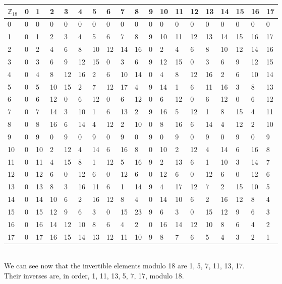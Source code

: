 \documentclass[paper=letter, fontsize=11pt]{scrartcl} %
\begin{document}
\begin{tabular}{|l|l|l|l|l|l|l|l|l|l|l|l|l|l|l|l|l|l|l|}
\hline
$\mathbb{Z}_{18}$ & 0 & 1  & 2  & 3  & 4  & 5  & 6  & 7  & 8  & 9 & 10 & 11 & 12 & 13 & 14 & 15 & 16 & 17 \\ \hline
0                 & 0 & 0  & 0  & 0  & 0  & 0  & 0  & 0  & 0  & 0 & 0  & 0  & 0  & 0  & 0  & 0  & 0  & 0  \\ \hline
1                 & 0 & 1  & 2  & 3  & 4  & 5  & 6  & 7  & 8  & 9 & 10 & 11 & 12 & 13 & 14 & 15 & 16 & 17 \\ \hline
2                 & 0 & 2  & 4  & 6  & 8  & 10 & 12 & 14 & 16 & 0 & 2  & 4  & 6  & 8  & 10 & 12 & 14 & 16 \\ \hline
3                 & 0 & 3  & 6  & 9  & 12 & 15 & 0  & 3  & 6  & 9 & 12 & 15 & 0  & 3  & 6  & 9  & 12 & 15 \\ \hline
4                 & 0 & 4  & 8  & 12 & 16 & 2  & 6  & 10 & 14 & 0 & 4  & 8  & 12 & 16 & 2  & 6  & 10 & 14 \\ \hline
5                 & 0 & 5  & 10 & 15 & 2  & 7  & 12 & 17 & 4  & 9 & 14 & 1  & 6  & 11 & 16 & 3  & 8  & 13 \\ \hline
6                 & 0 & 6  & 12 & 0  & 6  & 12 & 0  & 6  & 12 & 0 & 6  & 12 & 0  & 6  & 12 & 0  & 6  & 12 \\ \hline
7                 & 0 & 7  & 14 & 3  & 10 & 1  & 6  & 13 & 2  & 9 & 16 & 5  & 12 & 1  & 8  & 15 & 4  & 11 \\ \hline
8                 & 0 & 8  & 16 & 6  & 14 & 4  & 12 & 2  & 10 & 0 & 8  & 16 & 6  & 14 & 4  & 12 & 2  & 10 \\ \hline
9                 & 0 & 9  & 0  & 9  & 0  & 9  & 0  & 9  & 0  & 9 & 0  & 9  & 0  & 9  & 0  & 9  & 0  & 9  \\ \hline
10                & 0 & 10 & 2  & 12 & 4  & 14 & 6  & 16 & 8  & 0 & 10 & 2  & 12 & 4  & 14 & 6  & 16 & 8  \\ \hline
11                & 0 & 11 & 4  & 15 & 8  & 1  & 12 & 5  & 16 & 9 & 2  & 13 & 6  & 1  & 10 & 3  & 14 & 7  \\ \hline
12                & 0 & 12 & 6  & 0  & 12 & 6  & 0  & 12 & 6  & 0 & 12 & 6  & 0  & 12 & 6  & 0  & 12 & 6  \\ \hline
13                & 0 & 13 & 8  & 3  & 16 & 11 & 6  & 1  & 14 & 9 & 4  & 17 & 12 & 7  & 2  & 15 & 10 & 5  \\ \hline
14                & 0 & 14 & 10 & 6  & 2  & 16 & 12 & 8  & 4  & 0 & 14 & 10 & 6  & 2  & 16 & 12 & 8  & 4  \\ \hline
15                & 0 & 15 & 12 & 9  & 6  & 3  & 0  & 15 & 23 & 9 & 6  & 3  & 0  & 15 & 12 & 9  & 6  & 3  \\ \hline
16                & 0 & 16 & 14 & 12 & 10 & 8  & 6  & 4  & 2  & 0 & 16 & 14 & 12 & 10 & 8  & 6  & 4  & 2  \\ \hline
17                & 0 & 17 & 16 & 15 & 14 & 13 & 12 & 11 & 10 & 9 & 8  & 7  & 6  & 5  & 4  & 3  & 2  & 1  \\ \hline
\end{tabular}
\\

We can see now that the invertible elements modulo 18 are 1, 5, 7, 11, 13, 17. \\
Their inverses are, in order, 1, 11, 13, 5, 7, 17, modulo 18.
\end{document}
